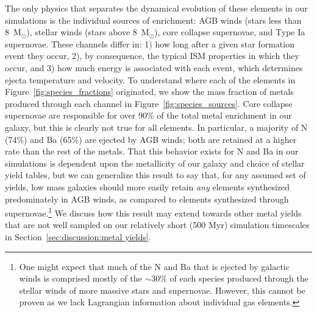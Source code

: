 \documentclass[twocolumn]{aastex61}
\begin{document}
The only physics that separates the dynamical evolution of these elements in our simulations is the individual sources of enrichment: AGB winds (stars less than 8~M$_{\odot}$), stellar winds (stars above 8~M$_{\odot}$), core collapse supernovae, and Type Ia supernovae. These channels differ in: 1) how long after a given star formation event they occur, 2), by consequence, the typical ISM properties in which they occur, and 3) how much energy is associated with each event, which determines ejecta temperature and velocity. To understand where each of the elements in Figure~\ref{fig:species_fractions} originated, we show the mass fraction of metals produced through each channel in Figure~\ref{fig:species_sources}. Core collapse supernovae are responsible for over 90\% of the total metal enrichment in our galaxy, but this is clearly not true for all elements. In particular, a majority of N (74\%) and Ba (65\%) are ejected by AGB winds; both are retained at a higher rate than the rest of the metals. That this behavior exists for N and Ba in our simulations is dependent upon the metallicity of our galaxy and choice of stellar yield tables, but we can generalize this result to say that, for any assumed set of yields, low mass galaxies should more easily retain \textit{any} elements synthesized predominately in AGB winds, as compared to elements synthesized through supernovae.\footnote{One might expect that much of the N and Ba that is ejected by galactic winds is comprised mostly of the $\sim$30\% of each species produced through the stellar winds of more massive stars and supernovae. However, this cannot be proven as we lack Lagrangian information about individual gas elements.}
We discuss how this result may extend towards other metal yields that are not well sampled on our relatively short (500 Myr) simulation timescales in Section~\ref{sec:discussion:metal yields}.
\end{document}
